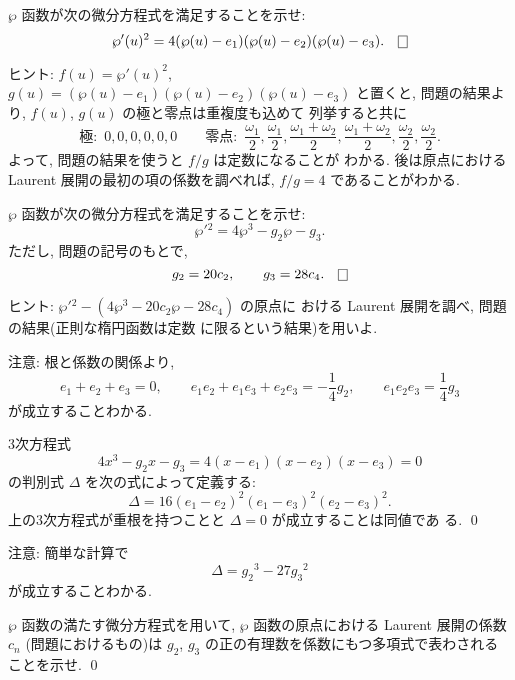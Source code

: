 \documentclass[12pt,twoside]{jarticle}
\def\pe{\wp}
\begin{document}
\begin{question}[$\pe$ 函数の満たす微分方程式1]\label{q:pede1}\qstar{*}
  $\pe$ 函数が次の微分方程式を満足することを示せ:
  \[
    \pe'(u)^2 = 4(\pe(u) - e_1)(\pe(u) - e_2)(\pe(u) - e_3).
  \qed
  \]
\end{question}

\noindent ヒント: $f(u)=\pe'(u)^2$, %
$g(u)=(\pe(u) - e_1)(\pe(u) - e_2)(\pe(u) - e_3)$ と置くと, %
問題の結果より, $f(u)$, $g(u)$ の極と零点は重複度も込めて
列挙すると共に
\[
  \text{極:}\enspace
  0,0,0,0,0,0
  \qquad
  \text{零点:}\enspace
  \frac{\omega_1}{2},\frac{\omega_1}{2},
  \frac{\omega_1+\omega_2}{2},\frac{\omega_1+\omega_2}{2},
  \frac{\omega_2}{2},\frac{\omega_2}{2}.
\] %
よって, 問題の結果を使うと $f/g$ は定数になることが
わかる. 後は原点における Laurent 展開の最初の項の係数を調べれば, %
$f/g=4$ であることがわかる.

\begin{question}[$\pe$ 函数の満たす微分方程式2]\label{q:pede2}\qstar{*}
  $\pe$ 函数が次の微分方程式を満足することを示せ:
  \[
    \pe'{}^2 = 4\pe^3 - g_2\pe - g_3.
  \]
  ただし, 問題の記号のもとで,
  \[
    g_2 = 20 c_2, \qquad g_3 = 28 c_4.
  \qed
  \]
\end{question}

\noindent ヒント: $\pe'{}^2 - (4\pe^3 - 20 c_2 \pe - 28 c_4)$ の原点に
おける Laurent 展開を調べ, 問題の結果(正則な楕円函数は定数
に限るという結果)を用いよ.

\medskip

\noindent 注意: 根と係数の関係より, 
\[
  e_1+e_2+e_3=0, \qquad
  e_1e_2 + e_1e_3 + e_2e_3 = - \frac{1}{4}g_2, \qquad
  e_1e_2e_3 = \frac{1}{4}g_3
\]
が成立することわかる.

\begin{Definition}[判別式]
  3次方程式
  \[
    4x^3 - g_2x - g_3 = 4(x-e_1)(x-e_2)(x-e_3) = 0
  \]
  の判別式 $\Delta$ を次の式によって定義する:
  \[
    \Delta = 16(e_1-e_2)^2(e_1-e_3)^2(e_2-e_3)^2.
  \]
  上の3次方程式が重根を持つことと $\Delta=0$ が成立することは同値であ
  る. \qed
\end{Definition}

\noindent 注意: 簡単な計算で
\[
  \Delta = g_2{}^3 - 27g_3{}^2
\]
が成立することわかる.

\begin{question}
  $\pe$ 函数の満たす微分方程式を用いて, $\pe$ 函数の原点における 
  Laurent 展開の係数 $c_n$ (問題におけるもの)は $g_2$,
  $g_3$ の正の有理数を係数にもつ多項式で表わされることを示せ. \qed
\end{question}
\end{document}
